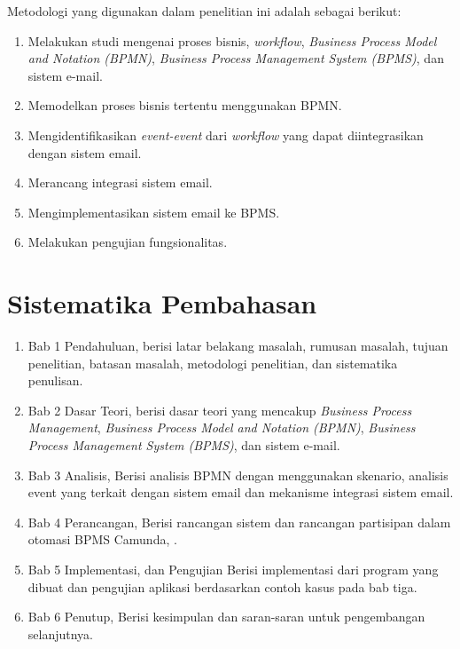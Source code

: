 Metodologi yang digunakan dalam penelitian ini adalah sebagai berikut:
\begin{enumerate}
	\item Melakukan studi mengenai proses bisnis, \textit{workflow}, \textit{Business Process Model and Notation (BPMN)}, \textit{Business Process Management System (BPMS)}, dan sistem e-mail. 
	\item Memodelkan proses bisnis tertentu menggunakan BPMN.
	\item Mengidentifikasikan \textit{event-event} dari \textit{workflow} yang dapat diintegrasikan dengan sistem email.
	\item Merancang integrasi sistem email.
	\item Mengimplementasikan sistem email ke BPMS.
	\item Melakukan pengujian fungsionalitas.
\end{enumerate}




\section{Sistematika Pembahasan}
\label{sec:sispem}

\begin{enumerate}
	\item Bab 1 Pendahuluan, berisi latar belakang masalah, rumusan masalah, tujuan penelitian, batasan masalah, metodologi penelitian, dan sistematika penulisan.
	\item Bab 2 Dasar Teori, berisi dasar teori yang mencakup \textit{Business Process Management}, \textit{Business Process Model and Notation (BPMN)}, \textit{Business Process Management System (BPMS)}, dan sistem e-mail.
	\item Bab 3 Analisis, Berisi analisis BPMN dengan menggunakan skenario, analisis event yang terkait dengan sistem email  dan mekanisme integrasi sistem email.
	\item Bab 4 Perancangan, Berisi rancangan sistem dan rancangan partisipan dalam otomasi BPMS Camunda, .
	\item Bab 5 Implementasi, dan Pengujian Berisi implementasi dari program yang dibuat dan pengujian aplikasi berdasarkan contoh kasus pada bab tiga.
	\item Bab 6 Penutup, Berisi kesimpulan dan saran-saran untuk pengembangan selanjutnya.
\end{enumerate}


